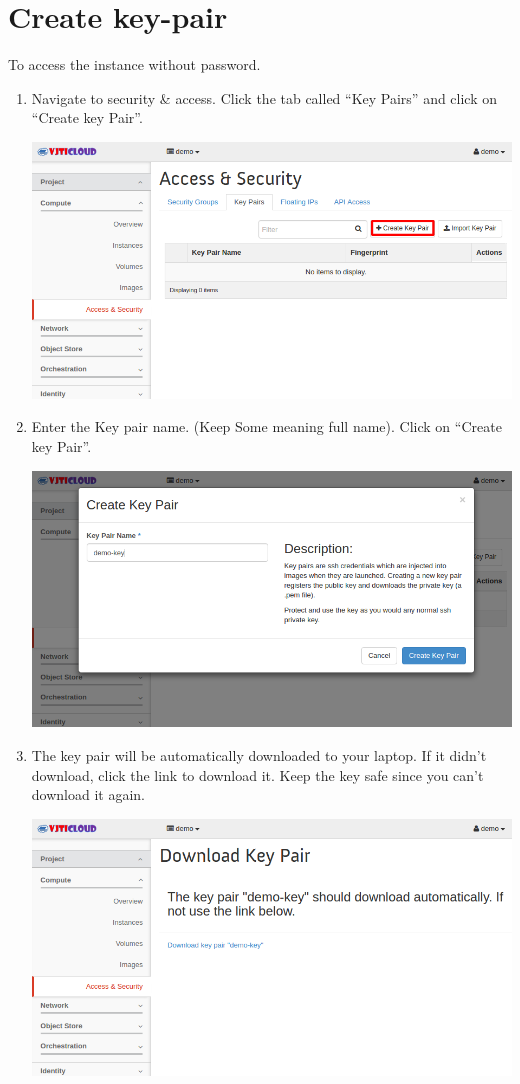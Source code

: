 \documentclass[letterpaper,10pt,english]{sphinxmanual}
\begin{document}
\section{Create key-pair}
\label{_source/user_guide/launch_instance:create-key-pair}\label{_source/user_guide/launch_instance:id1}
To access the instance without password.
\begin{enumerate}
\item {} 
Navigate to security \& access. Click the tab called “Key Pairs” and click on  “Create key Pair”.

\includegraphics{ask-key-pairs.png}

\item {} 
Enter the Key pair name.  (Keep Some meaning full name). Click on “Create key Pair”.

\includegraphics{ask-create-key-pair.png}

\item {} 
The key pair will be automatically downloaded to your laptop.  If it didn’t download, click the link to download it. Keep the key safe since you can’t download it again.

\includegraphics{ask-download-key-pair.png}


\end{enumerate}
\end{document}
